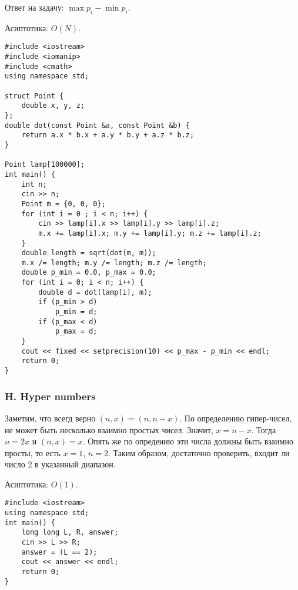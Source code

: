 Ответ на задачу: $\max{p_i} - \min{p_i}$.

Асиптотика: $O(N)$.

\begin{lstlisting}
#include <iostream>
#include <iomanip>
#include <cmath>
using namespace std;

struct Point {
    double x, y, z;
};
double dot(const Point &a, const Point &b) {
    return a.x * b.x + a.y * b.y + a.z * b.z;
}

Point lamp[100000];
int main() {
    int n;
    cin >> n;
    Point m = {0, 0, 0};
    for (int i = 0 ; i < n; i++) {
        cin >> lamp[i].x >> lamp[i].y >> lamp[i].z;
        m.x += lamp[i].x; m.y += lamp[i].y; m.z += lamp[i].z;
    }
    double length = sqrt(dot(m, m));
    m.x /= length; m.y /= length; m.z /= length;
    double p_min = 0.0, p_max = 0.0;
    for (int i = 0; i < n; i++) {
        double d = dot(lamp[i], m);
        if (p_min > d)
            p_min = d;
        if (p_max < d)
            p_max = d;
    }
    cout << fixed << setprecision(10) << p_max - p_min << endl;
    return 0;
}
\end{lstlisting}


\subsubsection*{H. Hyper numbers}

Заметим, что всегд верно $(n, x) = (n, n - x)$. По определению гипер-чисел, не может быть несколько взаимно простых чисел. Значит, $x = n - x$. Тогда $n = 2x$ и $(n, x) = x$. Опять же по опредению эти числа должны быть взаимно просты, то есть $x = 1$, $n = 2$. Таким образом, достаточно проверить, входит ли число 2 в указанный диапазон.

Асиптотика: $O(1)$.

\begin{lstlisting}
#include <iostream>
using namespace std;
int main() {
    long long L, R, answer;
    cin >> L >> R;
    answer = (L == 2);
    cout << answer << endl;
    return 0;
}
\end{lstlisting}